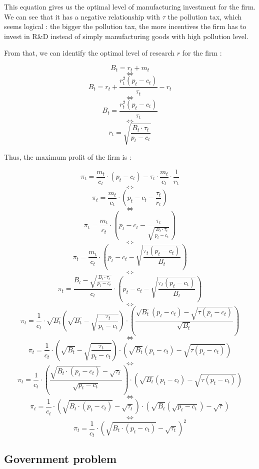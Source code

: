 \documentclass{article}
\begin{document}
This equation gives us the optimal level of manufacturing investment for the firm. We can see that it has a negative relationship with $\tau$ the pollution tax, which seems logical : the bigger the pollution tax, the more incentives the firm has to invest in R\&D instead of simply manufacturing goods with high pollution level. 

From that, we can identify the optimal level of research $r$ for the firm :

$$B_{t}=r_{t}+m_{t}$$
$$\iff$$
$$B_{t}=r_{t}+\frac{r_{t}^{2}\left(p_{t}-c_{t}\right)}{\tau_{t}}-r_{t}$$
$$\iff$$
$$B_{t}=\frac{r_{t}^{2}\left(p_{t}-c_{t}\right)}{\tau_{t}}$$
$$\iff$$
\begin{equation}
    r_{t}=\sqrt{\frac{B_{t}\cdot \tau_{t}}{p_{t}-c_{t}}}
\end{equation}


Thus, the maximum profit of the firm is : 

$$\pi_{t}= \frac{m_{t}}{c_{t}}\cdot\left(p_{t}-c_{t}\right)-\tau_{t}\cdot \frac{m_{t}}{c_{t}}\cdot \frac{1}{r_{t}}$$
$$\iff$$
$$\pi_{t}=\frac{m_{t}}{c_{t}}\cdot\left(p_{t}-c_{t}-\frac{\tau_{t}}{r_{t}}\right)$$
$$\iff$$
$$\pi_{t}=\frac{m_{t}}{c_{t}}\cdot\left(p_{t}-c_{t}-\frac{\tau_{t}}{\sqrt{\frac{B_{t}\cdot \tau_{t}}{p_{t}-c_{t}}}}\right)$$
$$\iff$$
$$\pi_{t}=\frac{m_{t}}{c_{t}}\cdot\left(p_{t}-c_{t}-\sqrt{\frac{\tau_{t}(p_{t}-c_{t})}{B_{t}}}\right)$$
$$\iff$$
$$\pi_{t}=\frac{B_{t}-\sqrt{\frac{B_{t}\cdot \tau_{t}}{p_{t}-c_{t}}}}{c_{t}}\cdot\left(p_{t}-c_{t}-\sqrt{\frac{\tau_{t}(p_{t}-c_{t})}{B_{t}}}\right)$$
$$\iff$$
$$\pi_{t}=\frac{1}{c_{t}}\cdot\sqrt{B_{t}}\left(\sqrt{B_{t}}-\sqrt{\frac{\tau_{t}}{p_{t}-c_{t}}}\right)\cdot\left(\frac{\sqrt{B_{t}}(p_{t}-c_{t})-\sqrt{\tau(p_{t}-c_{t})}}{\sqrt{B_{t}}}\right)$$
$$\iff$$
$$\pi_{t}=\frac{1}{c_{t}}\cdot\left(\sqrt{B_{t}}-\sqrt{\frac{\tau_{t}}{p_{t}-c_{t}}}\right)\cdot\left(\sqrt{B_{t}}(p_{t}-c_{t})-\sqrt{\tau(p_{t}-c_{t})}\right)$$
$$\iff$$
$$\pi_{t}=\frac{1}{c_{t}}\cdot\left(\frac{\sqrt{B_{t}\cdot (p_{t}-c_{t})}-\sqrt{\tau_{t}}}{\sqrt{p_{t}-c_{t}}}\right)\cdot\left(\sqrt{B_{t}}(p_{t}-c_{t})-\sqrt{\tau(p_{t}-c_{t})}\right)$$
$$\iff$$
$$\pi_{t}=\frac{1}{c_{t}}\cdot\left({\sqrt{B_{t}\cdot (p_{t}-c_{t})}-\sqrt{\tau_{t}}}\right)\cdot\left(\sqrt{B_{t}}(\sqrt{p_{t}-c_{t}})-\sqrt{\tau}\right)$$
$$\iff$$
$$\pi_{t}=\frac{1}{c_{t}}\cdot\left({\sqrt{B_{t}\cdot (p_{t}-c_{t})}-\sqrt{\tau_{t}}}\right)^{2}$$

\subsection{Government problem}
\end{document}
